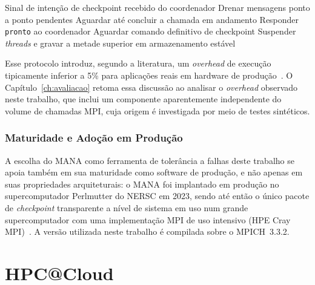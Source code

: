 \begin{algorithm}[htb]
  \caption{Decisão de \textit{checkpoint} seguro em cada \textit{rank} do MANA.}
  \label{alg:mana-checkpoint-decision}
  \begin{algorithmic}[1]
    \Require Sinal de intenção de checkpoint recebido do coordenador
    \State Drenar mensagens ponto a ponto pendentes
      \State Aguardar até concluir a chamada em andamento
    \EndIf
    \State Responder \texttt{pronto} ao coordenador
    \State Aguardar comando definitivo de checkpoint
    \State Suspender \textit{threads} e gravar a metade superior em armazenamento
      estável
  \end{algorithmic}
\end{algorithm}

Esse protocolo introduz, segundo a literatura, um \textit{overhead} de execução tipicamente
inferior a 5\% para aplicações reais em hardware de
produção~\cite{xu2024mana,xu2023mana}. O Capítulo~\ref{ch:avaliacao} retoma essa
discussão ao analisar o \textit{overhead} observado neste trabalho, que inclui um componente
aparentemente independente do volume de chamadas MPI, cuja origem é investigada por
meio de testes sintéticos.

\subsubsection{Maturidade e Adoção em Produção}
\label{sec:mana-producao}

A escolha do MANA como ferramenta de tolerância a
falhas deste trabalho se apoia também em sua maturidade como software de produção, e
não apenas em suas propriedades arquiteturais: o MANA foi implantado em produção no
supercomputador Perlmutter do NERSC em 2023, sendo até então o único pacote de
\textit{checkpoint} transparente a nível de sistema em uso num grande supercomputador com uma
implementação MPI de uso intensivo (HPE Cray MPI)~\cite{xu2023mana}. A versão
utilizada neste trabalho é compilada sobre o MPICH~3.3.2.


\section{HPC@Cloud}
\label{sec:hpcac}


